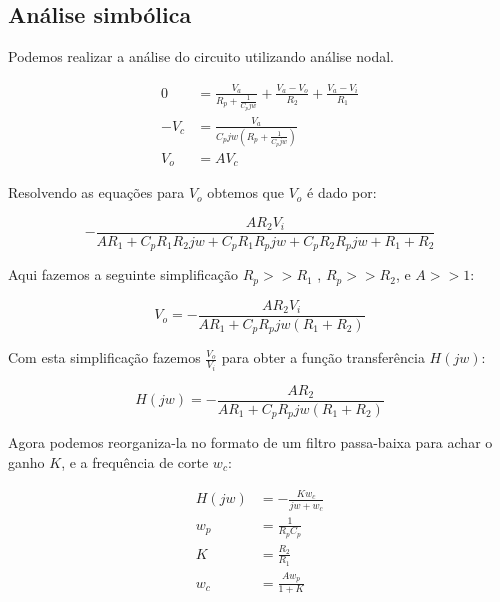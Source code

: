\documentclass[12pt,twoside, a4paper, twocolumn]{article}
\begin{document}
\newpage
\subsection{Análise simbólica}


Podemos realizar a análise do circuito utilizando análise nodal.


\begin{equation}
    \begin{aligned}
        0       & = \frac{V_{a}}{R_{p} + \frac{1}{C_{p} j w}} + \frac{V_{a} - V_{o}}{R_{2}} + \frac{V_{a} - V_{i}}{R_{1}} \\
        - V_{c} & = \frac{V_{a}}{C_{p} j w \left(R_{p} + \frac{1}{C_{p} j w}\right)}                                      \\
        V_{o}   & = A V_{c}
    \end{aligned}
\end{equation}


Resolvendo as equações para $V_o$ obtemos que $V_o$ é dado por:


\begin{equation}
    - \frac{A R_{2} V_{i}}{A R_{1} + C_{p} R_{1} R_{2} j w + C_{p} R_{1} R_{p} j w + C_{p} R_{2} R_{p} j w
        + R_{1} + R_{2}}
\end{equation}


Aqui fazemos a seguinte simplificação $R_p >> R_1$ , $R_p >> R_2$, e $A >> 1$:


\begin{equation}
    V_o = - \frac{A R_{2} V_{i}}{A R_{1} + C_{p} R_{p} j w \left(R_{1} + R_{2}\right)}
\end{equation}


Com esta simplificação fazemos $\frac{V_o}{V_i}$ para obter a função transferência $H\left(jw\right)$:


\begin{equation}
    H\left(jw\right) = - \frac{A R_{2}}{A R_{1} + C_{p} R_{p} j w \left(R_{1} + R_{2}\right)}
\end{equation}


Agora podemos reorganiza-la no formato de um filtro passa-baixa para achar o ganho $K$, e a frequência de corte $w_c$:


\begin{equation}
    \begin{aligned}
        H(jw) & = - \frac{K w_c}{jw + w_c} \\
        w_p   & = \frac{1}{R_p C_p}        \\
        K     & = \frac{R_2}{R_1}          \\
        w_c   & = \frac{A w_p}{1 + K}
    \end{aligned}
\end{equation}
\end{document}

